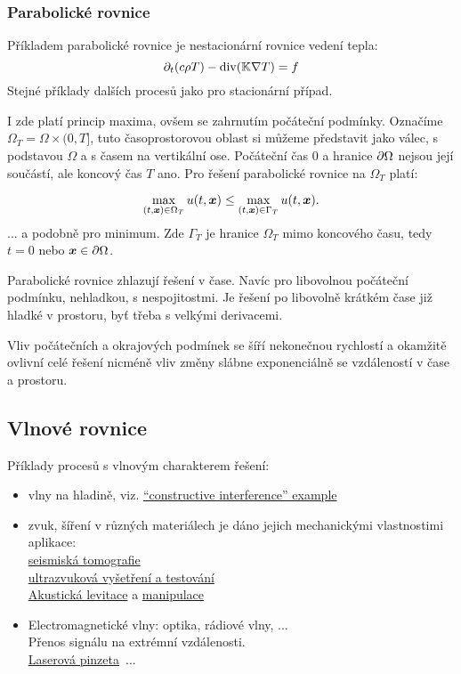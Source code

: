 \subsubsection{Parabolické rovnice}
Příkladem parabolické rovnice je nestacionární rovnice vedení tepla:
\[
    \partial_t(c \rho T) -\operatorname{div}({\mathbb{K}} \nabla T) = f
\]
Stejné příklady dalších procesů jako pro stacionární případ.

I zde platí princip maxima, ovšem se zahrnutím počáteční podmínky.
Označíme $\Omega_T = \Omega \times (0, T]$, tuto časoprostorovou oblast 
si můžeme představit jako válec, s podstavou $\Omega$ a s časem na vertikální ose. 
Počáteční čas $0$ a hranice $\partial \Omega$ nejsou její součástí, ale koncový čas $T$
ano. Pro řešení parabolické rovnice na $\Omega_T$ platí:

\[
    \max_{(t, \mathbf{\boldsymbol{x}}) \in \Omega_T} u(t, \mathbf{\boldsymbol{x}}) \le \max_{(t, \mathbf{\boldsymbol{x}}) \in \Gamma_T}  u(t, \mathbf{\boldsymbol{x}}).
\]
... a podobně pro minimum. Zde $\Gamma_T$ je hranice $\Omega_T$ mimo koncového času, tedy 
$t=0$ nebo $\mathbf{\boldsymbol{x}} \in \partial \Omega$.

Parabolické rovnice zhlazují řešení v čase. Navíc pro libovolnou počáteční podmínku, nehladkou, s nespojitostmi. Je řešení po libovolně krátkém
čase již hladké v prostoru, byť třeba s velkými derivacemi. 

Vliv počátečních a okrajových podmínek se šíří nekonečnou rychlostí a okamžitě ovlivní celé řešení
nicméně vliv změny slábne exponenciálně se vzdáleností v čase a prostoru.
  
\subsection{Vlnové rovnice}
Příklady procesů s vlnovým charakterem řešení:
  \begin{itemize}
    \item vlny na hladině, viz. 
    \href{https://www.youtube.com/watch?v=6EKZKaWhufI}{``constructive interference'' example}
    \item zvuk, šíření v různých materiálech je dáno jejich mechanickými vlastnostimi\\
          aplikace:\\
          \href{https://en.wikipedia.org/wiki/Seismic_tomography}{seismiská tomografie}\\
          \href{https://en.wikipedia.org/wiki/Ultrasonic_testing}{ultrazvuková vyšetření a testování}\\
          \href{https://en.wikipedia.org/wiki/Acoustic_levitation}{Akustická levitace}
          a \href{https://www.youtube.com/watch?v=c05VSs3q56U&t=140s}{manipulace}\\
    \item Electromagnetické vlny: optika, rádiové vlny, ...\\
    Přenos signálu na extrémní vzdálenosti.\\
\href{https://en.wikipedia.org/wiki/Optical_tweezers}{Laserová pinzeta}\
     ...
     \end{itemize}


